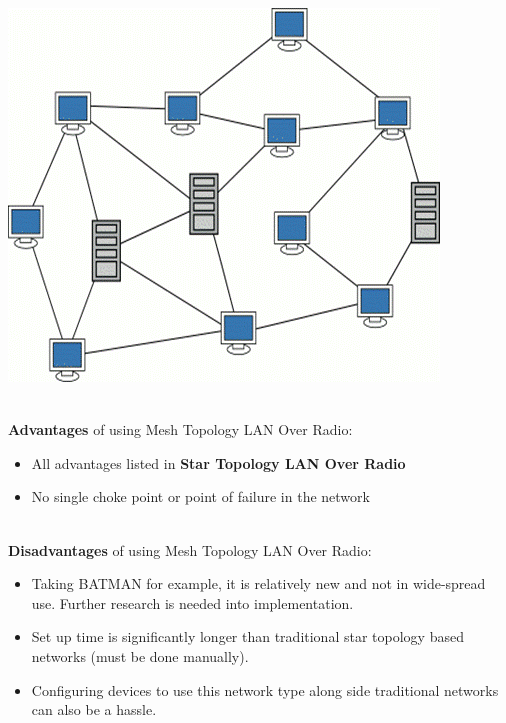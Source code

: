 	\begin{center}
		\includegraphics[scale=0.6]{mesh_topology.png}
	\end{center} \cite{IMG2}

	\noindent \\ \textbf{Advantages} of using Mesh Topology LAN Over Radio:
	\begin{itemize}
		\item All advantages listed in \textbf{Star Topology LAN Over Radio}
		\item No single choke point or point of failure in the network
	\end{itemize}

	\noindent \\ \textbf{Disadvantages} of using Mesh Topology LAN Over Radio:
	\begin{itemize}
		\item Taking BATMAN for example, it is relatively new and not in wide-spread use.  Further research is needed into implementation.
		\item Set up time is significantly longer than traditional star topology based networks (must be done manually).
		\item Configuring devices to use this network type along side traditional networks can also be a hassle.
	\end{itemize}


